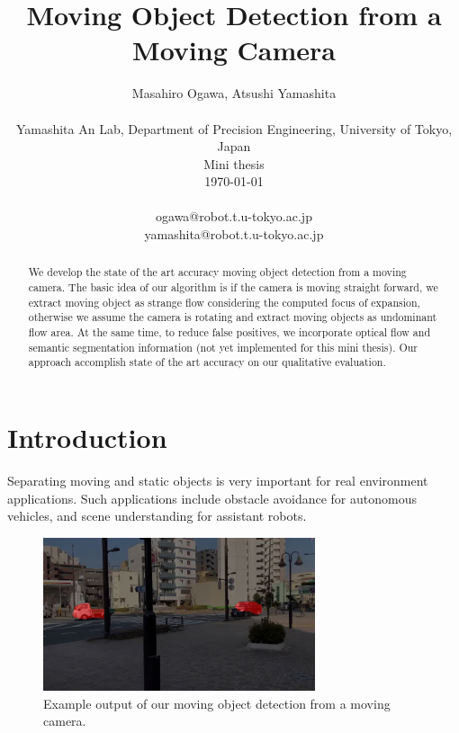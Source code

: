 \documentclass[10pt, twocolumn]{article}
\begin{document}
\title{Moving Object Detection from a Moving Camera}

\author{Masahiro Ogawa, Atsushi Yamashita \\
  \\
  Yamashita An Lab,
  Department of Precision Engineering,
  University of Tokyo, Japan\\
  Mini thesis\\
  \today
  \\
  \\
  ogawa@robot.t.u-tokyo.ac.jp\\
  yamashita@robot.t.u-tokyo.ac.jp}

\maketitle
\thispagestyle{empty}

\begin{abstract}
 We develop the state of the art accuracy moving object detection from a moving camera.
 The basic idea of our algorithm is if the camera is moving straight forward, we extract moving object as strange flow considering the computed focus of expansion, otherwise we assume the camera is rotating and extract moving objects as undominant flow area. At the same time, to reduce false positives, we incorporate optical flow and semantic segmentation information (not yet implemented for this mini thesis).
 Our approach accomplish state of the art accuracy on our qualitative evaluation.
\end{abstract}



\section{Introduction}
Separating moving and static objects is very important for real environment applications.
Such applications include obstacle avoidance for autonomous vehicles, and scene understanding for assistant robots.

\begin{figure}[t]
  \centering
  \includegraphics[width=8cm]{fig/exampleoutput.jpg}
  \caption{Example output of our moving object detection from a moving camera.}
  \label{fig:exampleoutput}
\end{figure}
\end{document}

